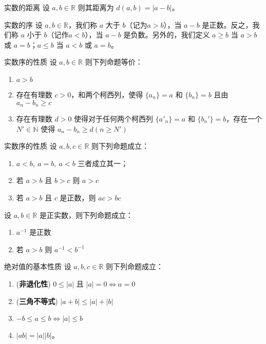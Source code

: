 \begin{definition}{实数的距离}{}
	设 $a,b\in \mathbb R$ 则其距离为 $d(a,b) = |a-b|$。
\end{definition}

\begin{definition}{实数的序}{}
	设 $a,b\in \mathbb R$，我们称 $a$ 大于 $b$（记为$a>b$），当 $a-b$ 是正数。反之，我们称 $a$ 小于 $b$（记作$a<b$），当 $a-b$ 是负数。另外的，我们定义 $a\ge b$ 当 $a > b$ 或 $a=b$；$a\le b$ 当 $a < b$ 或 $a=b$。
\end{definition}

\begin{theorem}{实数序的性质}{}
	设 $a,b\in \mathbb R$ 则下列命题等价：
	\begin{enumerate}
		\item $a>b$
		\item 存在有理数 $c > 0$，和两个柯西列，使得 $\{a_n\} = a$ 和 $\{b_n\} = b$ 且由 $a_n - b_n \ge c$
		\item 存在有理数 $d > 0$ 使得对于任何两个柯西列 $\{a'_n\} = a$ 和 $\{b_n'\} = b$，存在一个 $N'\in \mathbb N$ 使得 $a_n-b_n \ge d(n\ge N')$
	\end{enumerate}
\end{theorem}

\begin{theorem}{实数序的性质}{}
	设 $a,b, c \in \mathbb R$ 则下列命题成立：
	
	\begin{enumerate}
		\item $a<b,~a=b,~a<b$ 三者成立其一；
		\item 若 $a>b$ 且 $b>c$ 则 $a>c$
		\item 若 $a > b$ 且 $c$ 是正数，则 $ac > bc$
	\end{enumerate}
\end{theorem}

\begin{corollary}{}{}
	设 $a,b\in \mathbb R$ 是正实数，则下列命题成立：
	
	\begin{enumerate}
		\item $a^{-1}$ 是正数
		\item 若 $a> b$ 则 $a^{-1} < b ^{-1}$
	\end{enumerate}
\end{corollary}

\begin{theorem}{绝对值的基本性质}{}
	设 $a,b,c\in \mathbb R$ 则下列命题成立：
	
	\begin{enumerate}
		\item (\textbf{非退化性}) $0\le |a|$ 且 $|a| = 0 \iff a = 0$
		\item (\textbf{三角不等式}) $|a+b| \le |a| + |b|$
		\item $-b \le a \le b \iff |a| \le b$
		\item $|ab| = |a| |b|$。
	\end{enumerate}
\end{theorem}

